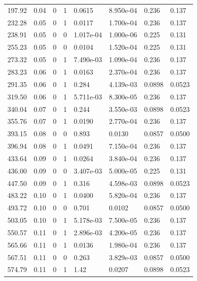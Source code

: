 \documentclass[preview]{standalone}
\begin{document}
{{\begin{tabular}{L{1.2cm}C{1.2cm} C{0.3cm}C{0.5cm} C{1.4cm}C{1.4cm} C{1.4cm}C{1.4cm}}
  197.92  &  0.04  & 0     &  1 &  0.0615  & 8.950e-04  & 0.236 &  0.137   \\ 
  232.28  &  0.05  & 0     &  1 &  0.0117  & 1.700e-04  & 0.236 &  0.137   \\ 
  238.91  &  0.05  & 0     &  0 &  1.017e-04  & 1.000e-06  & 0.225 &  0.131   \\ 
  255.23  &  0.05  & 0     &  0 &  0.0104  & 1.520e-04  & 0.225 &  0.131   \\ 
  273.32  &  0.05  & 0     &  1 &  7.490e-03  & 1.090e-04  & 0.236 &  0.137   \\ 
  283.23  &  0.06  & 0     &  1 &  0.0163  & 2.370e-04  & 0.236 &  0.137   \\ 
  291.35  &  0.06  & 0     &  1 &  0.284  & 4.139e-03  & 0.0898 &  0.0523   \\ 
  319.50  &  0.06  & 0     &  1 &  5.711e-03  & 8.300e-05  & 0.236 &  0.137   \\ 
  340.04  &  0.07  & 0     &  1 &  0.244  & 3.550e-03  & 0.0898 &  0.0523   \\ 
  355.76  &  0.07  & 0     &  1 &  0.0190  & 2.770e-04  & 0.236 &  0.137   \\ 
  393.15  &  0.08  & 0     &  0 &  0.893  & 0.0130  & 0.0857 &  0.0500   \\ 
  396.94  &  0.08  & 0     &  1 &  0.0491  & 7.150e-04  & 0.236 &  0.137   \\ 
  433.64  &  0.09  & 0     &  1 &  0.0264  & 3.840e-04  & 0.236 &  0.137   \\ 
  436.00  &  0.09  & 0     &  0 &  3.407e-03  & 5.000e-05  & 0.225 &  0.131   \\ 
  447.50  &  0.09  & 0     &  1 &  0.316  & 4.598e-03  & 0.0898 &  0.0523   \\ 
  483.22  &  0.10  & 0     &  1 &  0.0400  & 5.820e-04  & 0.236 &  0.137   \\ 
  493.72  &  0.10  & 0     &  0 &  0.701  & 0.0102  & 0.0857 &  0.0500   \\ 
  503.05  &  0.10  & 0     &  1 &  5.178e-03  & 7.500e-05  & 0.236 &  0.137   \\ 
  550.57  &  0.11  & 0     &  1 &  2.896e-03  & 4.200e-05  & 0.236 &  0.137   \\ 
  565.66  &  0.11  & 0     &  1 &  0.0136  & 1.980e-04  & 0.236 &  0.137   \\ 
  567.51  &  0.11  & 0     &  0 &  0.263  & 3.829e-03  & 0.0857 &  0.0500   \\ 
  574.79  &  0.11  & 0     &  1 &  1.42  & 0.0207  & 0.0898 &  0.0523   \\ 

\end{tabular}}}
\end{document}
